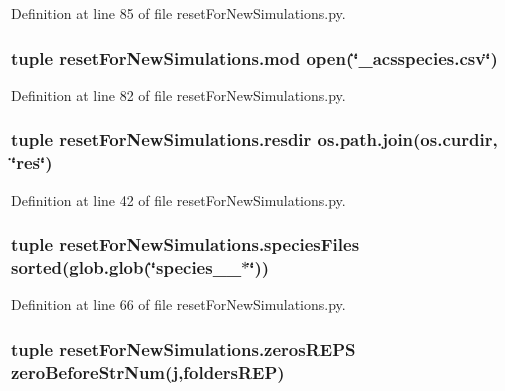 Definition at line 85 of file reset\-For\-New\-Simulations.\-py.

\hypertarget{namespacereset_for_new_simulations_a7a0ded4bf7d86d876a380d82be3c66bd}{
\subsubsection[{mod}]{\setlength{\rightskip}{0pt plus 5cm}tuple reset\-For\-New\-Simulations.\-mod open(\char`\"{}\-\_\-acsspecies.\-csv\char`\"{})}}\label{namespacereset_for_new_simulations_a7a0ded4bf7d86d876a380d82be3c66bd}


Definition at line 82 of file reset\-For\-New\-Simulations.\-py.

\hypertarget{namespacereset_for_new_simulations_addd72b08bf24570a2a851808a0b21949}{
\subsubsection[{resdir}]{\setlength{\rightskip}{0pt plus 5cm}tuple reset\-For\-New\-Simulations.\-resdir os.\-path.\-join(os.\-curdir, \char`\"{}res\char`\"{})}}\label{namespacereset_for_new_simulations_addd72b08bf24570a2a851808a0b21949}


Definition at line 42 of file reset\-For\-New\-Simulations.\-py.

\hypertarget{namespacereset_for_new_simulations_a876ddf603699b40992ad784167b1121e}{
\subsubsection[{species\-Files}]{\setlength{\rightskip}{0pt plus 5cm}tuple reset\-For\-New\-Simulations.\-species\-Files sorted(glob.\-glob(\char`\"{}species\-\_\-\_\-$\ast$\char`\"{}))}}\label{namespacereset_for_new_simulations_a876ddf603699b40992ad784167b1121e}


Definition at line 66 of file reset\-For\-New\-Simulations.\-py.

\hypertarget{namespacereset_for_new_simulations_a9f88ef39633f68b28f6b0e96d5ebb34c}{
\subsubsection[{zeros\-R\-E\-P\-S}]{\setlength{\rightskip}{0pt plus 5cm}tuple reset\-For\-New\-Simulations.\-zeros\-R\-E\-P\-S {\bf zero\-Before\-Str\-Num}({\bf j},{\bf folders\-R\-E\-P})}}\label{namespacereset_for_new_simulations_a9f88ef39633f68b28f6b0e96d5ebb34c}


